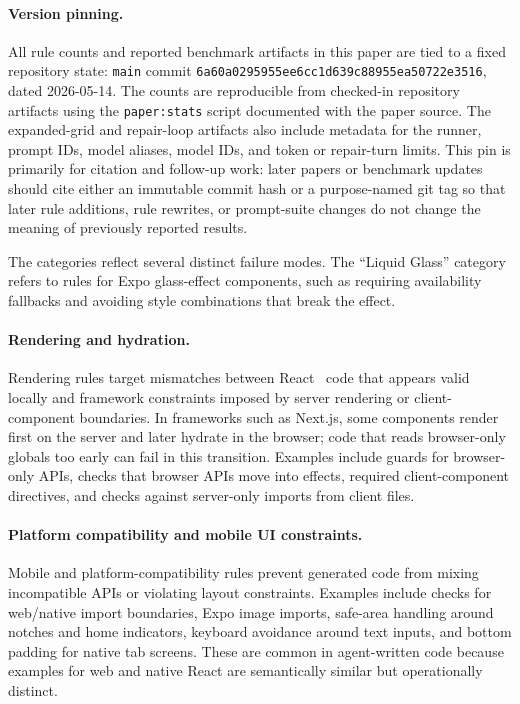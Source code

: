 \documentclass[11pt]{article}
\begin{document}
\FloatBarrier

\paragraph{Version pinning.}
All rule counts and reported benchmark artifacts in this paper are tied to a fixed repository state: \texttt{main} commit \texttt{6a60a0295955ee6cc1d639c88955ea50722e3516}, dated 2026-05-14. The counts are reproducible from checked-in repository artifacts using the \texttt{paper:stats} script documented with the paper source. The expanded-grid and repair-loop artifacts also include metadata for the runner, prompt IDs, model aliases, model IDs, and token or repair-turn limits. This pin is primarily for citation and follow-up work: later papers or benchmark updates should cite either an immutable commit hash or a purpose-named git tag so that later rule additions, rule rewrites, or prompt-suite changes do not change the meaning of previously reported results.

The categories reflect several distinct failure modes. The ``Liquid Glass'' category refers to rules for Expo glass-effect components, such as requiring availability fallbacks and avoiding style combinations that break the effect.

\paragraph{Rendering and hydration.}
Rendering rules target mismatches between React~\cite{react} code that appears valid locally and framework constraints imposed by server rendering or client-component boundaries. In frameworks such as Next.js, some components render first on the server and later hydrate in the browser; code that reads browser-only globals too early can fail in this transition. Examples include guards for browser-only APIs, checks that browser APIs move into effects, required client-component directives, and checks against server-only imports from client files.

\paragraph{Platform compatibility and mobile UI constraints.}
Mobile and platform-compatibility rules prevent generated code from mixing incompatible APIs or violating layout constraints. Examples include checks for web/native import boundaries, Expo image imports, safe-area handling around notches and home indicators, keyboard avoidance around text inputs, and bottom padding for native tab screens. These are common in agent-written code because examples for web and native React are semantically similar but operationally distinct.
\end{document}
